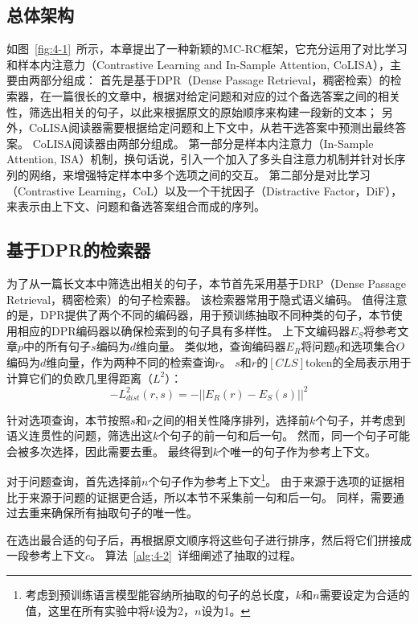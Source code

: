 \subsection{总体架构}



如图~\ref{fig:4-1}~所示，本章提出了一种新颖的MC-RC框架，它充分运用了对比学习和样本内注意力（Contrastive Learning and In-Sample Attention, CoLISA），主要由两部分组成：
首先是基于DPR（Dense Passage Retrieval，稠密检索）的检索器，在一篇很长的文章中，根据对给定问题和对应的过个备选答案之间的相关性，筛选出相关的句子，以此来根据原文的原始顺序来构建一段新的文本；
另外，CoLISA阅读器需要根据给定问题和上下文中，从若干选答案中预测出最终答案。
CoLISA阅读器由两部分组成。
第一部分是样本内注意力（In-Sample Attention, ISA）机制，换句话说，引入一个加入了多头自注意力机制并针对长序列的网络，来增强特定样本中多个选项之间的交互。
第二部分是对比学习（Contrastive Learning，CoL）以及一个干扰因子（Distractive Factor，DiF），来表示由上下文、问题和备选答案组合而成的序列。

\subsection{基于DPR的检索器}
为了从一篇长文本中筛选出相关的句子，本节首先采用基于DRP（Dense Passage Retrieval，稠密检索）的句子检索器。
该检索器常用于隐式语义编码\cite{karpukhin2020dense}。
值得注意的是，DPR提供了两个不同的编码器，用于预训练抽取不同种类的句子，本节使用相应的DPR编码器以确保检索到的句子具有多样性。
上下文编码器$E_S$将参考文章$p$中的所有句子$s$编码为$d$维向量。
类似地，查询编码器$E_R$将问题$q$和选项集合$O$编码为$d$维向量，作为两种不同的检索查询$r$。
$s$和$r$的$[CLS]$token的全局表示用于计算它们的负欧几里得距离（$L^2$）：
\begin{equation}
    -L^2_{dist}(r,s)=-||E_R(r)-E_S(s)||^2
\end{equation}

针对选项查询，本节按照$s$和$r$之间的相关性降序排列，选择前$k$个句子，并考虑到语义连贯性的问题，筛选出这$k$个句子的前一句和后一句。
然而，同一个句子可能会被多次选择，因此需要去重。
最终得到$k$个唯一的句子作为参考上下文。

对于问题查询，首先选择前$n$个句子作为参考上下文\footnote{考虑到预训练语言模型能容纳所抽取的句子的总长度，$k$和$n$需要设定为合适的值，这里在所有实验中将$k$设为2，$n$设为1。}。
由于来源于选项的证据相比于来源于问题的证据更合适，所以本节不采集前一句和后一句。
同样，需要通过去重来确保所有抽取句子的唯一性。

在选出最合适的句子后，再根据原文顺序将这些句子进行排序，然后将它们拼接成一段参考上下文$c$。
算法~\ref{alg:4-2}~详细阐述了抽取的过程。

